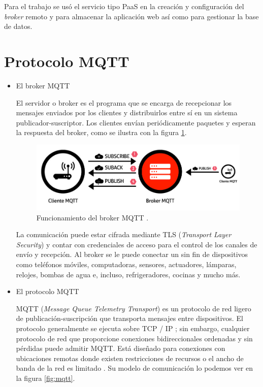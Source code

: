 
Para el trabajo se usó el servicio tipo PaaS en la creación y configuración del \emph{broker} remoto y para almacenar la aplicación web así como para gestionar la base de datos.

\section{Protocolo MQTT}

\begin{itemize}
\item El broker MQTT

El servidor o broker es el programa que se encarga de recepcionar los mensajes enviados por los clientes y distribuirlos entre sí en un sistema publicador-suscriptor. Los clientes envían periódicamente paquetes y esperan la respuesta del broker, como se ilustra con la figura \ref{fig:broker}. 

\begin{figure}[htbp]
	\centering
	\includegraphics[width=.8\textwidth]{./Figures/broker.jpg}
	\caption{Funcionamiento del broker MQTT \protect\footnotemark.}

	\label{fig:broker}
\end{figure}


La comunicación puede estar cifrada mediante TLS (\emph{Transport Layer Security}) y contar con credenciales de acceso para el control de los canales de envío y recepción. Al broker se le puede conectar un sin fin de dispositivos como teléfonos móviles, computadoras, sensores, actuadores, lámparas, relojes, bombas de agua e, incluso, refrigeradores, cocinas y mucho más. 

\vspace{1cm}
\item El protocolo MQTT

MQTT (\textit{Message Queue Telemetry Transport}) es un protocolo de red ligero de publicación-suscripción que transporta mensajes entre dispositivos. El protocolo generalmente se ejecuta sobre TCP / IP ; sin embargo, cualquier protocolo de red que proporcione conexiones bidireccionales ordenadas y sin pérdidas puede admitir MQTT. Está diseñado para conexiones con ubicaciones remotas donde existen restricciones de recursos o el ancho de banda de la red es limitado \citep{WEBSITE:3}. Su modelo de comunicación lo podemos ver en la figura \ref{fig:mqtt}.


\end{itemize}
